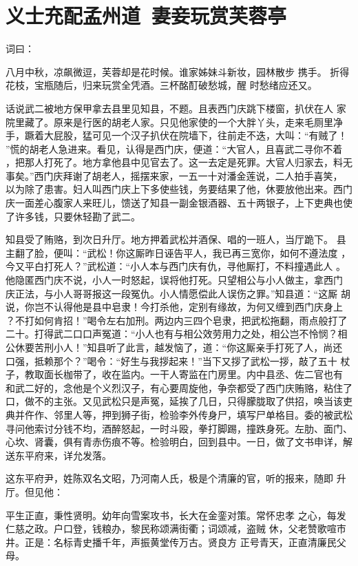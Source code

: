 \chapter{义士充配孟州道~妻妾玩赏芙蓉亭}

词曰：

八月中秋，凉飙微逗，芙蓉却是花时候。谁家姊妹斗新妆，园林散步
携手。  折得花枝，宝瓶随后，归来玩赏全凭酒。三杯酩酊破愁城，醒
时愁绪应还又。

话说武二被地方保甲拿去县里见知县，不题。且表西门庆跳下楼窗，扒伏在人
家院里藏了。原来是行医的胡老人家。只见他家使的一个大胖丫头，走来毛厕里净
手，蹶着大屁股，猛可见一个汉子扒伏在院墙下，往前走不迭，大叫：“有贼了！
”慌的胡老人急进来。看见，认得是西门庆，便道：“大官人，且喜武二寻你不着
，把那人打死了。地方拿他县中见官去了。这一去定是死罪。大官人归家去，料无
事矣。”西门庆拜谢了胡老人，摇摆来家，一五一十对潘金莲说，二人拍手喜笑，
以为除了患害。妇人叫西门庆上下多使些钱，务要结果了他，休要放他出来。西门
庆一面差心腹家人来旺儿，馈送了知县一副金银酒器、五十两银子，上下吏典也使
了许多钱，只要休轻勘了武二。

知县受了贿赂，到次日升厅。地方押着武松并酒保、唱的一班人，当厅跪下。
县主翻了脸，便叫：“武松！你这厮昨日诬告平人，我已再三宽你，如何不遵法度
，今又平白打死人？”武松道：“小人本与西门庆有仇，寻他厮打，不料撞遇此人
。他隐匿西门庆不说，小人一时怒起，误将他打死。只望相公与小人做主，拿西门
庆正法，与小人哥哥报这一段冤仇。小人情愿偿此人误伤之罪。”知县道：“这厮
胡说，你岂不认得他是县中皂隶！今打杀他，定别有缘故，为何又缠到西门庆身上
？不打如何肯招！”喝令左右加刑。两边内三四个皂隶，把武松拖翻，雨点般打了
二十。打得武二口口声冤道：“小人也有与相公效劳用力之处，相公岂不怜悯？相
公休要苦刑小人！”知县听了此言，越发恼了，道：“你这厮亲手打死了人，尚还
口强，抵赖那个？”喝令：“好生与我拶起来！”当下又拶了武松一拶，敲了五十
杖子，教取面长枷带了，收在监内。一干人寄监在门房里。内中县丞、佐二官也有
和武二好的，念他是个义烈汉子，有心要周旋他，争奈都受了西门庆贿赂，粘住了
口，做不的主张。又见武松只是声冤，延挨了几日，只得朦胧取了供招，唤当该吏
典并仵作、邻里人等，押到狮子街，检验李外传身尸，填写尸单格目。委的被武松
寻问他索讨分钱不均，酒醉怒起，一时斗殴，拳打脚踢，撞跌身死。左肋、面门、
心坎、肾囊，俱有青赤伤痕不等。检验明白，回到县中。一日，做了文书申详，解
送东平府来，详允发落。

这东平府尹，姓陈双名文昭，乃河南人氏，极是个清廉的官，听的报来，随即
升厅。但见他：

平生正直，秉性贤明。幼年向雪案攻书，长大在金銮对策。常怀忠孝
之心，每发仁慈之政。户口登，钱粮办，黎民称颂满街衢；词颂减，盗贼
休，父老赞歌喧市井。正是：名标青史播千年，声振黄堂传万古。贤良方
正号青天，正直清廉民父母。


